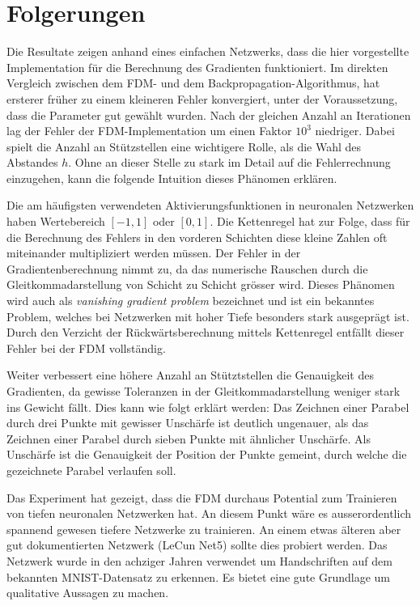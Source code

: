 %
%
%
\section{Folgerungen
\label{ableitung:section:folgerungen}}
Die Resultate zeigen anhand eines einfachen Netzwerks, dass die hier
vorgestellte Implementation für die Berechnung des Gradienten funktioniert.
Im direkten Vergleich zwischen dem FDM- und dem
Backpropagation-Algorithmus, hat ersterer früher zu einem kleineren
Fehler konvergiert, unter der Voraussetzung,
dass die Parameter gut gewählt wurden.
Nach der gleichen Anzahl an Iterationen lag der Fehler der FDM-Implementation um einen Faktor $10^3$ niedriger.
Dabei spielt die Anzahl an Stützstellen eine wichtigere Rolle, als die Wahl des Abstandes $h$.
Ohne an dieser Stelle zu stark im Detail auf die Fehlerrechnung einzugehen, kann die folgende Intuition dieses Phänomen erklären.

Die am häufigsten verwendeten Aktivierungsfunktionen in neuronalen
Netzwerken haben Wertebereich $[-1, 1]$ oder $[0, 1]$.
Die Kettenregel hat zur Folge, dass für die Berechnung des Fehlers
in den vorderen Schichten diese kleine Zahlen oft miteinander
multipliziert werden müssen.
%
Der Fehler in der Gradientenberechnung nimmt zu, da das numerische
Rauschen durch die Gleitkommadarstellung von Schicht zu Schicht
grösser wird.
Dieses Phänomen wird auch als {\em vanishing gradient problem}
bezeichnet und ist ein bekanntes Problem, welches bei Netzwerken
mit hoher Tiefe besonders stark ausgeprägt ist.
%
Durch den Verzicht der Rückwärtsberechnung mittels Kettenregel entfällt
dieser Fehler bei der FDM vollständig. 

Weiter verbessert eine höhere Anzahl an Stütztstellen die Genauigkeit des
Gradienten, da gewisse Toleranzen in der Gleitkommadarstellung weniger
stark ins Gewicht fällt.
Dies kann wie folgt erklärt werden: Das Zeichnen einer Parabel durch drei Punkte mit gewisser Unschärfe ist deutlich ungenauer, als das Zeichnen einer Parabel durch sieben Punkte mit ähnlicher Unschärfe.
Als Unschärfe ist die Genauigkeit der Position der Punkte gemeint, durch welche die gezeichnete Parabel verlaufen soll.

Das Experiment hat gezeigt, dass die FDM durchaus Potential zum Trainieren
von tiefen neuronalen Netzwerken hat.
An diesem Punkt wäre es ausserordentlich spannend gewesen tiefere Netzwerke zu trainieren.
An einem etwas älteren aber gut dokumentierten Netzwerk (LeCun Net5)
sollte dies probiert werden.
Das Netzwerk wurde in den achziger Jahren verwendet um Handschriften
auf dem bekannten MNIST-Datensatz zu erkennen.
%
Es bietet eine gute Grundlage um qualitative Aussagen zu machen.

